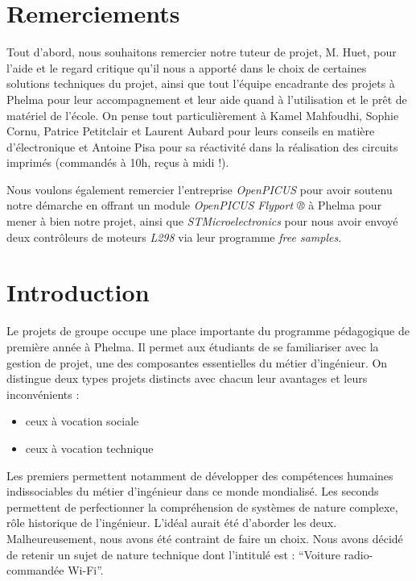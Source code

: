 \documentclass[a4paper,12pt]{report}
\begin{document}

\chapter*{Remerciements}
Tout d’abord, nous souhaitons remercier notre tuteur de projet, M. Huet, pour l’aide et le regard critique qu’il nous a apporté dans le choix de certaines solutions techniques du projet, ainsi que tout l’équipe encadrante des projets à Phelma pour leur accompagnement et leur aide quand à l’utilisation et le prêt de matériel de l’école. On pense tout particulièrement à Kamel Mahfoudhi, Sophie Cornu, Patrice Petitclair et Laurent Aubard pour leurs conseils en matière d’électronique et Antoine Pisa pour sa réactivité dans la réalisation des circuits imprimés (commandés à 10h, reçus à midi !).

Nous voulons également remercier l’entreprise \emph{OpenPICUS} pour avoir soutenu notre démarche en offrant un module \emph{OpenPICUS Flyport ®} à Phelma pour mener à bien notre projet, ainsi que \emph{STMicroelectronics} pour nous avoir envoyé deux contrôleurs de moteurs \emph{L298} via leur programme \emph{free samples}.

\chapter*{Introduction}
Le projets de groupe occupe une place importante du programme pédagogique
de première année à Phelma. Il permet aux étudiants de se familiariser avec la gestion de projet, une des composantes essentielles du métier d’ingénieur.
On distingue deux types projets distincts avec chacun leur avantages et leurs inconvénients : 
\begin{itemize}
	\item ceux à vocation sociale
	\item ceux à vocation technique
\end{itemize}
Les premiers permettent notamment de développer des compétences humaines indissociables du métier d’ingénieur dans ce monde mondialisé. Les seconds permettent de perfectionner la compréhension de systèmes de nature complexe, rôle historique de l’ingénieur.
L’idéal aurait été d’aborder les deux. Malheureusement, nous avons été contraint de faire un choix. Nous avons décidé de retenir un sujet de nature technique dont l’intitulé est : “Voiture radio-commandée Wi-Fi”.
\end{document}
